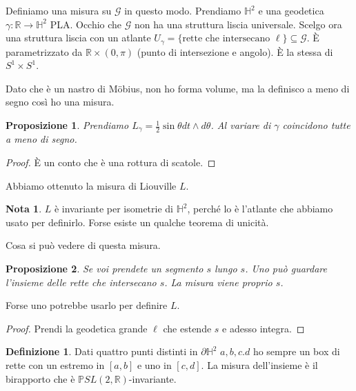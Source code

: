 \documentclass[a4paper]{article}
\newtheorem{proposition}{Proposizione}
\theoremstyle{definition}
\newtheorem{definition}{Definizione}
\newtheorem{remark}{Nota}
\begin{document}
    Definiamo una misura su $\mathcal G$ in questo modo. Prendiamo $\mathbb H^2$ e una geodetica $\gamma: \mathbb R \to \mathbb H^2$ PLA. Occhio che $\mathcal G$ non ha una struttura liscia universale. Scelgo ora una struttura liscia con un atlante $U_{\gamma} = \{\textrm{rette che intersecano }\ell\} \subseteq \mathcal G$. È parametrizzato da $\mathbb R \times (0,\pi)$ (punto di intersezione e angolo). È la stessa di $S^1 \times S^1$.

    Dato che è un nastro di Möbius, non ho forma volume, ma la definisco a meno di segno così ho una misura.

    \begin{proposition}
        Prendiamo $L_{\gamma} = \frac12 \sin \theta dt \wedge d\theta$. Al variare di $\gamma$ coincidono tutte a meno di segno.
    \end{proposition}

    \begin{proof}
        È un conto che è una rottura di scatole.
    \end{proof}

    Abbiamo ottenuto la misura di Liouville $L$.

    \begin{remark}
        $L$ è invariante per isometrie di $\mathbb H^2$, perché lo è l'atlante che abbiamo usato per definirlo. Forse esiste un qualche teorema di unicità.
    \end{remark}

    Cosa si può vedere di questa misura.

    \begin{proposition}
        Se voi prendete un segmento $s$ lungo $s$. Uno può guardare l'insieme delle rette che intersecano $s$. La misura viene proprio $s$.
    \end{proposition}

    Forse uno potrebbe usarlo per definire $L$.

    \begin{proof}
        Prendi la geodetica grande $\ell$ che estende $s$ e adesso integra.
    \end{proof}

    \begin{definition}
        Dati quattro punti distinti in $\partial \mathbb H^2$ $a,b,c.d$ ho sempre un box di rette con un estremo in $[a,b]$ e uno in $[c,d]$. La misura dell'insieme è il birapporto che è $\mathbb P SL(2,\mathbb R)$-invariante.
    \end{definition}
\end{document}
